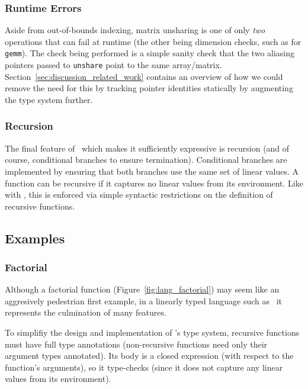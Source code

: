 \subsubsection{Runtime Errors}

Aside from out-of-bounds indexing, matrix unsharing is one of only \emph{two}
operations that can fail at runtime (the other being dimension checks, such as
for \texttt{gemm}). The check being performed is a simple sanity check that the
two aliasing pointers passed to \texttt{unshare} point to the same array/matrix.
Section~\ref{sec:discussion_related_work} contains an overview of how we could
remove the need for this by tracking pointer identities statically by
augmenting the type system further.

\subsubsection{Recursion}

The final feature of \lang\ which makes it sufficiently expressive is recursion
(and of course, conditional branches to ensure termination). Conditional
branches are implemented by ensuring that both branches use the same set of
linear values. A function can be recursive if it captures no linear values from
its environment. Like with , this is enforced via simple syntactic
restrictions on the definition of recursive functions.

\subsection{Examples}

\subsubsection{Factorial}\label{subsubsec:factorial}

Although a factorial function (Figure~\ref{fig:lang_factorial}) may seem like
an aggresively pedestrian first example, in a linearly typed language such as
\lang\ it represents the culmination of many features.

To simplifiy the design and implementation of \lang's type system, recursive
functions must have full type annotations (non-recursive functions need only
their argument types annotated). Its body is a closed expression (with respect
to the function's arguments), so it type-checks (since it does not capture any
linear values from its environment).

